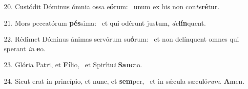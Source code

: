 20. Custódit Dóminus ómnia ossa e\textbf{ó}rum: \ast\  unum ex his non con\textit{te}\textbf{ré}tur.\

21. Mors peccatórum \textbf{pés}sima: \ast\  et qui odérunt justum, \textit{de}\textbf{lín}quent.\

22. Rédimet Dóminus ánimas servórum su\textbf{ó}rum: \ast\  et non delínquent omnes qui sperant \textit{in} \textbf{e}o.\

23. Glória Patri, et \textbf{Fí}lio, \ast\  et Spirítu\textit{i} \textbf{Sanc}to.\

24. Sicut erat in princípio, et nunc, et \textbf{sem}per, \ast\  et in sǽcula sæculó\textit{rum}. \textbf{A}men.\

